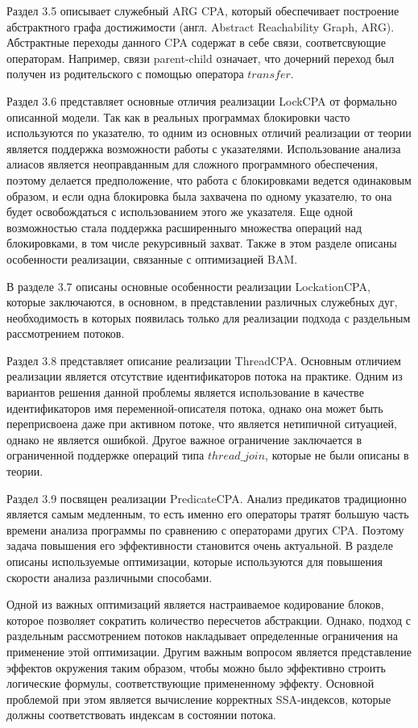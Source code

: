 Раздел 3.5 описывает служебный ARG CPA, который обеспечивает построение абстрактного графа достижимости (англ. Abstract Reachability Graph, ARG).
Абстрактные переходы данного CPA содержат в себе связи, соответсвующие операторам.
Например, связи parent-child означает, что дочерний переход был получен из родительского с помощью оператора $transfer$.

Раздел 3.6 представляет основные отличия реализации LockCPA от формально описанной модели. 
Так как в реальных программах блокировки часто используются по указателю, то одним из основных отличий реализации от теории является поддержка возможности работы с указателями.
Использование анализа алиасов является неоправданным для сложного программного обеспечения, поэтому делается предположение, что работа с блокировками ведется одинаковым образом, и если одна блокировка была захвачена по одному указателю, то она будет освобождаться с использованием этого же указателя.
Еще одной возможностью стала поддержка расширенныго множества операций над блокировками, в том числе рекурсивный захват.
Также в этом разделе описаны особенности реализации, связанные с оптимизацией BAM.

В разделе 3.7 описаны основные особенности реализации LockationCPA, которые заключаются, в основном, в представлении различных служебных дуг, необходимость в которых появилась только для реализации подхода с раздельным рассмотрением потоков.

Раздел 3.8 представляет описание реализации ThreadCPA.
Основным отличием реализации является отсутствие идентификаторов потока на практике. 
Одним из вариантов решения данной проблемы является использование в качестве идентификаторов имя переменной-описателя потока, однако она может быть переприсвоена даже при активном потоке, что является нетипичной ситуацией, однако не является ошибкой.
Другое важное ограничение заключается в ограниченной поддержке операций типа $thread\_join$, которые не были описаны в теории.

Раздел 3.9 посвящен реализации PredicateCPA.
Анализ предикатов традиционно является самым медленным, то есть именно его операторы тратят большую часть времени анализа программы по сравнению с операторами других CPA.
Поэтому задача повышения его эффективности становится очень актуальной.
В разделе описаны используемые оптимизации, которые используются для повышения скорости анализа различными способами.

Одной из важных оптимизаций является настраиваемое кодирование блоков, которое позволяет сократить количество пересчетов абстракции. 
Однако, подход с раздельным рассмотрением потоков накладывает определенные ограничения на применение этой оптимизации.
Другим важным вопросом является представление эффектов окружения таким образом, чтобы можно было эффективно строить логические формулы, соответствующие примененному эффекту.
Основной проблемой при этом является вычисление корректных SSA-индексов, которые должны соответствовать индексам в состоянии потока.

